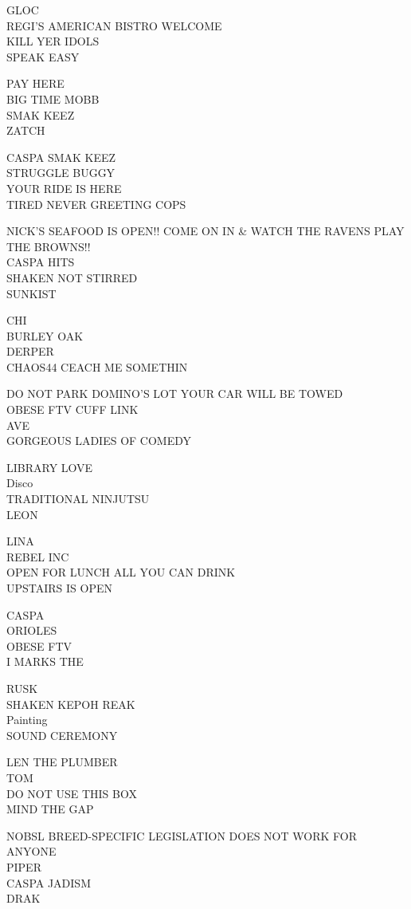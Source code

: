\documentclass[10pt,letterpaper]{article}
\begin{document}
GLOC\\
REGI'S AMERICAN BISTRO WELCOME\\
KILL YER IDOLS\\
SPEAK EASY

PAY HERE\\
BIG TIME MOBB\\
SMAK KEEZ\\
ZATCH

CASPA SMAK KEEZ\\
STRUGGLE BUGGY\\
YOUR RIDE IS HERE\\
TIRED NEVER GREETING COPS

NICK'S SEAFOOD IS OPEN!! COME ON IN \& WATCH THE RAVENS PLAY THE BROWNS!!\\
CASPA HITS\\
SHAKEN NOT STIRRED\\
SUNKIST

CHI\\
BURLEY OAK\\
DERPER\\
CHAOS44 CEACH ME SOMETHIN

DO NOT PARK DOMINO'S LOT YOUR CAR WILL BE TOWED\\
OBESE FTV CUFF LINK\\
AVE\\
GORGEOUS LADIES OF COMEDY

LIBRARY LOVE\\
Disco\\
TRADITIONAL NINJUTSU\\
LEON

LINA\\
REBEL INC\\
OPEN FOR LUNCH ALL YOU CAN DRINK\\
UPSTAIRS IS OPEN

CASPA\\
ORIOLES\\
OBESE FTV\\
I MARKS THE

RUSK\\
SHAKEN KEPOH REAK\\
Painting\\
SOUND CEREMONY

LEN THE PLUMBER\\
TOM\\
DO NOT USE THIS BOX\\
MIND THE GAP

NOBSL BREED{-}SPECIFIC LEGISLATION DOES NOT WORK FOR ANYONE\\
PIPER\\
CASPA JADISM\\
DRAK
\end{document}
